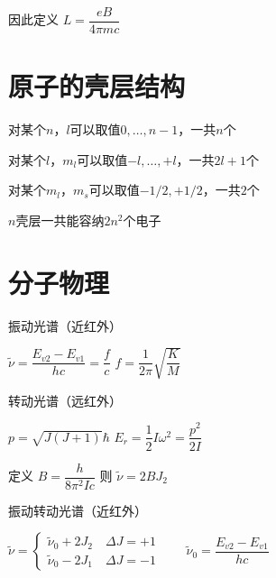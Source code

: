 \documentclass{article}
\begin{document}
\begin{multicols}{2}
因此定义 $L = \dfrac{eB}{4 \pi m c} $

\section{原子的壳层结构}

对某个$n$，$l$可以取值$0,\dots,n-1$，一共$n$个

对某个$l$，$m_l$可以取值$-l,\dots,+l$，一共$2l+1$个

对某个$m_l$，$m_s$可以取值$-1/2,+1/2$，一共$2$个

$n$壳层一共能容纳$2n^2$个电子

\section{分子物理}

振动光谱（近红外）

$\tilde{\nu} = \dfrac{E_{v2} - E_{v1}}{hc} = \dfrac{f}{c} $ \quad $f = \dfrac{1}{2\pi} \sqrt{\dfrac{K}{M} } $ 

转动光谱（远红外）

$p = \sqrt{J \left( J + 1 \right)} \hbar$ \quad $E_r = \dfrac{1}{2} I \omega^2 = \dfrac{p^2}{2I}  $ 

定义 $B=\dfrac{h}{8 \pi^2 I c} $ 则 $\tilde{\nu} = 2 B J_2$

振动转动光谱（近红外）

$\tilde{\nu} = \left\{
\begin{aligned}
  \tilde{\nu}_0 + 2 J_2 \quad \Delta J = + 1 \\
  \tilde{\nu}_0 - 2 J_1 \quad \Delta J = - 1
\end{aligned}
\right.
\quad\quad
\tilde{\nu}_0 = \dfrac{E_{v2} - E_{v1}}{hc} 
$
\end{multicols}
\end{document}
